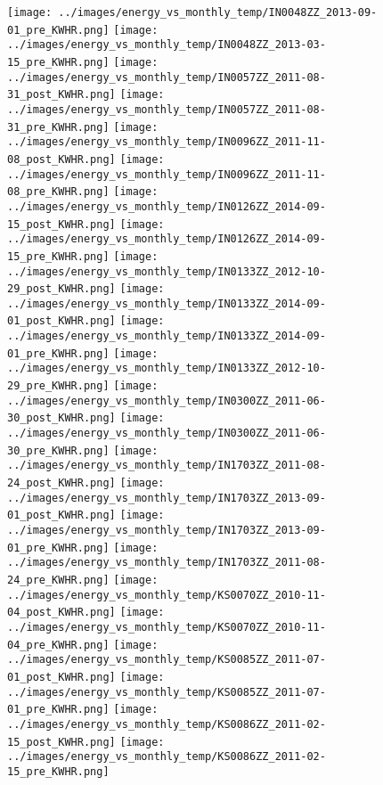 \clearpage
\begin{figure}
\centering
\texttt{[image: ../images/energy\_vs\_monthly\_temp/IN0048ZZ\_2013-09-01\_pre\_KWHR.png]}
\texttt{[image: ../images/energy\_vs\_monthly\_temp/IN0048ZZ\_2013-03-15\_pre\_KWHR.png]}
\texttt{[image: ../images/energy\_vs\_monthly\_temp/IN0057ZZ\_2011-08-31\_post\_KWHR.png]}
\texttt{[image: ../images/energy\_vs\_monthly\_temp/IN0057ZZ\_2011-08-31\_pre\_KWHR.png]}
\texttt{[image: ../images/energy\_vs\_monthly\_temp/IN0096ZZ\_2011-11-08\_post\_KWHR.png]}
\texttt{[image: ../images/energy\_vs\_monthly\_temp/IN0096ZZ\_2011-11-08\_pre\_KWHR.png]}
\texttt{[image: ../images/energy\_vs\_monthly\_temp/IN0126ZZ\_2014-09-15\_post\_KWHR.png]}
\texttt{[image: ../images/energy\_vs\_monthly\_temp/IN0126ZZ\_2014-09-15\_pre\_KWHR.png]}
\texttt{[image: ../images/energy\_vs\_monthly\_temp/IN0133ZZ\_2012-10-29\_post\_KWHR.png]}
\texttt{[image: ../images/energy\_vs\_monthly\_temp/IN0133ZZ\_2014-09-01\_post\_KWHR.png]}
\texttt{[image: ../images/energy\_vs\_monthly\_temp/IN0133ZZ\_2014-09-01\_pre\_KWHR.png]}
\texttt{[image: ../images/energy\_vs\_monthly\_temp/IN0133ZZ\_2012-10-29\_pre\_KWHR.png]}
\texttt{[image: ../images/energy\_vs\_monthly\_temp/IN0300ZZ\_2011-06-30\_post\_KWHR.png]}
\texttt{[image: ../images/energy\_vs\_monthly\_temp/IN0300ZZ\_2011-06-30\_pre\_KWHR.png]}
\texttt{[image: ../images/energy\_vs\_monthly\_temp/IN1703ZZ\_2011-08-24\_post\_KWHR.png]}
\texttt{[image: ../images/energy\_vs\_monthly\_temp/IN1703ZZ\_2013-09-01\_post\_KWHR.png]}
\texttt{[image: ../images/energy\_vs\_monthly\_temp/IN1703ZZ\_2013-09-01\_pre\_KWHR.png]}
\texttt{[image: ../images/energy\_vs\_monthly\_temp/IN1703ZZ\_2011-08-24\_pre\_KWHR.png]}
\texttt{[image: ../images/energy\_vs\_monthly\_temp/KS0070ZZ\_2010-11-04\_post\_KWHR.png]}
\texttt{[image: ../images/energy\_vs\_monthly\_temp/KS0070ZZ\_2010-11-04\_pre\_KWHR.png]}
\texttt{[image: ../images/energy\_vs\_monthly\_temp/KS0085ZZ\_2011-07-01\_post\_KWHR.png]}
\texttt{[image: ../images/energy\_vs\_monthly\_temp/KS0085ZZ\_2011-07-01\_pre\_KWHR.png]}
\texttt{[image: ../images/energy\_vs\_monthly\_temp/KS0086ZZ\_2011-02-15\_post\_KWHR.png]}
\texttt{[image: ../images/energy\_vs\_monthly\_temp/KS0086ZZ\_2011-02-15\_pre\_KWHR.png]}
\end{figure}
